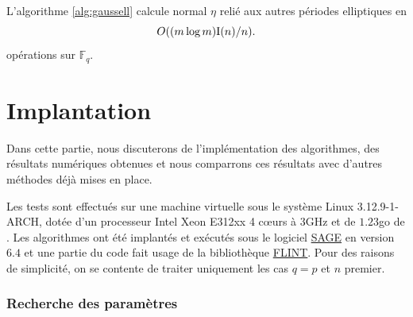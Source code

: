 \documentclass[a4paper]{article} %
\numberwithin{section}{part}
\numberwithin{equation}{section}
\newcommand\GF[1]{\mathbb{F}_{#1}}
\newcommand\I[1]{\textup{I}(#1)}
\begin{document}
\newpage
\begin{prop}
L'algorithme \ref{alg:gaussell} calcule normal $\eta$ relié aux autres périodes
elliptiques en
\begin{equation}
O((m\,\textup{log\,}m)\I{n}/n).
\end{equation}
opérations sur $\GF{q}$.
\end{prop}
\newpage

\part{Implantation}
\label{trois}
Dans cette partie, nous discuterons de l'implémentation des algorithmes, des
résultats numériques obtenues et nous comparrons ces résultats avec d'autres
méthodes déjà mises en place.\par
Les tests sont effectués sur une machine virtuelle sous le système Linux 
3.12.9-1-ARCH, dotée d'un processeur Intel Xeon E312xx 4 c\oe urs à 
$3$GHz et de $1.23$go de . Les algorithmes ont été implantés et 
exécutés sous le logiciel \href{http://www.sagemath.org/}{SAGE} en version 
$6.4$ et une partie du code fait usage de la bibliothèque 
\href{http://www.flintlib.org/}{FLINT}. Pour des raisons de simplicité, on se
contente de traiter uniquement les cas $q = p$ et $n$ premier.
\section{Recherche des paramètres}
\end{document}
